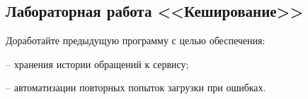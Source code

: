 \subsection{Лабораторная работа <<Кеширование>> }

Доработайте предыдущую программу с целью обеспечения:

-- хранения истории обращений к сервису;

-- автоматизации повторных попыток загрузки при ошибках.

